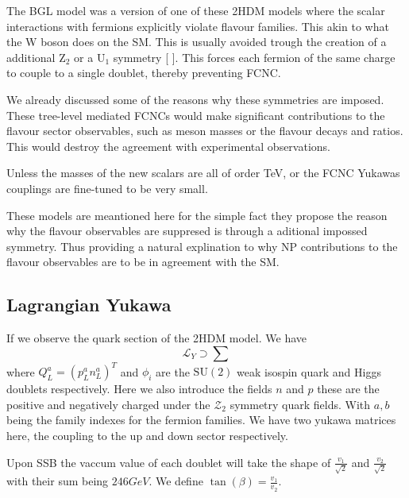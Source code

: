 The BGL model was a version of one of these 2HDM models where the scalar interactions with fermions explicitly violate flavour families. This akin to what the W boson does on the SM. This is usually avoided trough the creation of a additional $\mathrm{Z}_2$  or a $\mathrm{U}_1$ symmetry [
]. This forces each fermion of the same charge to couple to a single doublet, thereby preventing FCNC.

We already discussed some of the reasons why these symmetries are imposed. These tree-level mediated FCNCs would make significant contributions to the flavour sector observables, such as meson masses or the flavour decays and ratios. This would destroy the agreement with experimental observations. 

Unless the masses of the new scalars are all of order TeV, or the FCNC Yukawas couplings are fine-tuned to be very small. 

These models are meantioned here for the simple fact they propose the reason why the flavour observables are suppresed is through a aditional impossed symmetry. Thus providing a natural explination to why NP contributions to the flavour observables are to be in agreement with the SM. 

\subsection{Lagrangian Yukawa}

If we observe the quark section of the 2HDM model. We have 
%
\begin{equation}
\mathcal{L}_Y \supset \sum
\end{equation}
%
where $Q^a_L = \left( p^a_L n^a_L \right)^T$ and $\phi_i$ are the $\mathrm{SU(2)}$ weak isospin quark and Higgs doublets respectively. Here we also introduce the fields $n$ and $p$ these are the positive and negatively charged  under the $\mathcal{Z}_2$ symmetry quark fields. With $a,b$ being the family indexes for the fermion families. We have two yukawa matrices here, the coupling to the up and down sector respectively. 

Upon SSB the vaccum value of each doublet will take the shape of $\frac{v_1}{\sqrt{2}}$ and $\frac{v_2}{\sqrt{2}}$ with their sum being $246 GeV$. We define $\tan(\beta)=\frac{v_1}{v_2}$.

